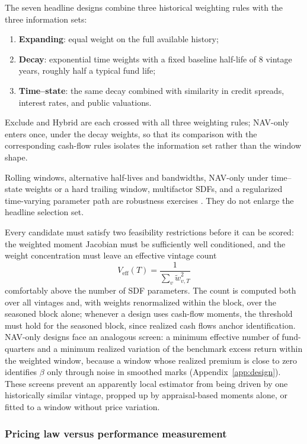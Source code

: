 \documentclass[11pt]{article}
\begin{document}
The seven headline designs combine three historical weighting rules with the
three information sets:
\begin{enumerate}
\item \textbf{Expanding}: equal weight on the full available history;
\item \textbf{Decay}: exponential time weights with a fixed baseline
      half-life of 8 vintage years, roughly half a typical fund life;
\item \textbf{Time--state}: the same decay combined with similarity in
      credit spreads, interest rates, and public valuations.
\end{enumerate}
Exclude and Hybrid are each crossed with all three weighting rules; NAV-only
enters once, under the decay weights, so that its comparison with the
corresponding cash-flow rules isolates the information set rather than the
window shape.

Rolling windows, alternative half-lives and bandwidths, NAV-only under
time--state weights or a hard trailing window, multifactor SDFs, and a
regularized time-varying parameter path are robustness exercises
\citep{CuiFengHong2024}. They do not enlarge the headline selection set.

Every candidate must satisfy two feasibility restrictions before it can be
scored: the weighted moment Jacobian must be sufficiently well conditioned,
and the weight concentration must leave an effective vintage count
\[
V_{\mathrm{eff}}(T)=\frac{1}{\sum_v\widetilde w_{v,T}^2}
\]
comfortably above the number of SDF parameters. The count is computed both
over all vintages and, with weights renormalized within the block, over the
seasoned block alone; whenever a design uses cash-flow moments, the threshold
must hold for the seasoned block, since realized cash flows anchor
identification. NAV-only designs face an analogous screen: a minimum
effective number of fund-quarters and a minimum realized variation of the
benchmark excess return within the weighted window, because a window whose
realized premium is close to zero identifies $\beta$ only through noise in
smoothed marks (Appendix~\ref{app:design}). These screens prevent an
apparently local estimator from being driven by one historically similar
vintage, propped up by appraisal-based moments alone, or fitted to a window
without price variation.

\subsubsection{Pricing law versus performance measurement}
\label{sec:pricinglaw}
\end{document}
